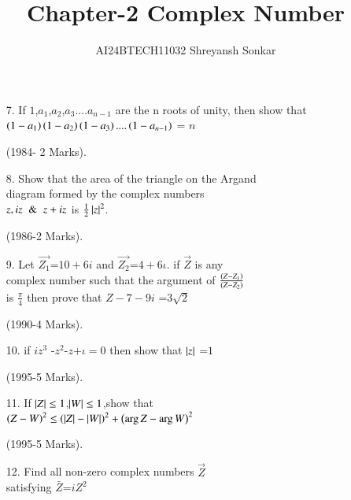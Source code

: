 \documentclass[journal,12pt,twocolumn]{IEEEtran}
\theoremstyle{remark}
\begin{document}

\vspace{3cm}

\title{Chapter-2 Complex Number}
\author{AI24BTECH11032 Shreyansh Sonkar
}
\maketitle
\newpage
\bigskip

\renewcommand{\thefigure}{\theenumi}
\renewcommand{\thetable}{\theenumi}
\begin{enumerate}




\item[7.] If $1$,$a_1$,$a_2$,$a_3$....$a_{n-1}$
 are the n roots of unity, then show that $\left(1-a_1\right)\left(1-a_2\right)\left(1-a_3\right)....\left(1-a_{n-1}\right)$ = $n$  
 
  \hfill (1984- 2 Marks).\\



\item[8.]  Show that the area of the 
  triangle on the Argand\\ 
  diagram formed by the complex 
  numbers\\
  $z,  iz \And z+  iz$ 
  is $\frac{1}{2}\left\vert z\right\vert^2$.

  \hfill (1986-2 Marks).\\

\item[9.] Let $\vec{Z_1}$=$10+6i$ and $\vec{Z_2}$=$4+6\iota$. if $\vec{Z}$ is any \\
complex number such that the argument of ${\frac{\left(Z-Z_1\right)}{\left(Z-Z_2
\right)}}$\\
is  ${\frac{\pi}{4}}$ then prove that $Z-7-9i$ =$3\sqrt{2}$

 \hfill(1990-4 Marks).\\


\item[10.] if {$iz^{3}$ -$z^2$-$z$+$\iota=0$} then show that $\left\vert z\right\vert$ =$1$

\hfill(1995-5 Marks).\\

\item[11.] If $\left\vert Z\right\vert\le1$,$\left\vert W\right\vert\le1$,show that\\
$\left(Z-W\right)^2\le\left(\left\vert Z\right\vert-\left\vert W\right\vert\right)^2+\left(\arg Z-\arg W\right)^2$ 

\hfill(1995-5 Marks). \\


\item[12.] Find all non-zero complex numbers $\vec{Z}$ \\
satisfying $\bar Z$=$ iZ^2 $ 


\end{enumerate}
\end{document}
